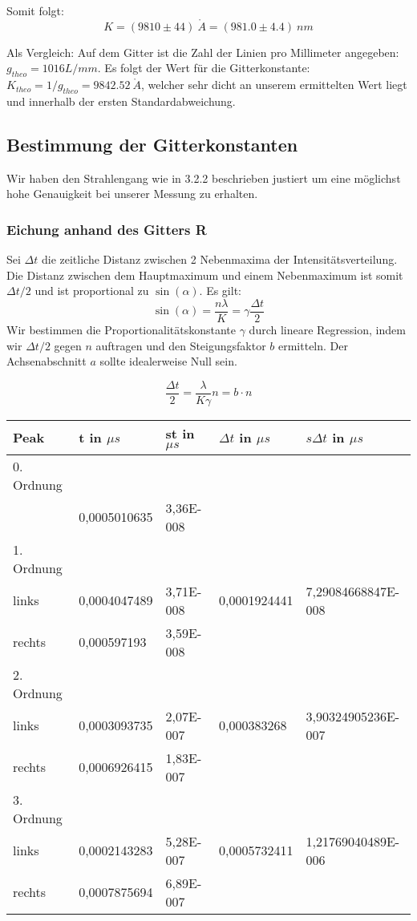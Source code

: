 Somit folgt: $$\boxed{K=(9810 \pm 44) \ \mathring A = (981.0 \pm 4.4) \ nm}$$

Als Vergleich: Auf dem Gitter ist die Zahl der Linien pro Millimeter angegeben: \\ $g_{theo}=1016 L/mm$. Es folgt der Wert f\"ur die Gitterkonstante: $K_{theo} = 1/g_{theo} = 9842.52 \ \mathring A$, welcher sehr dicht an unserem ermittelten Wert liegt und innerhalb der ersten Standardabweichung.

\subsection{Bestimmung der Gitterkonstanten}

Wir haben den Strahlengang wie in 3.2.2 beschrieben justiert um eine m\"oglichst hohe Genauigkeit bei unserer Messung zu erhalten.

\subsubsection{Eichung anhand des Gitters R}

Sei $\Delta t$ die zeitliche Distanz zwischen 2 Nebenmaxima der Intensit\"atsverteilung. Die Distanz zwischen dem Hauptmaximum und einem Nebenmaximum ist somit $\Delta t/2$ und ist proportional zu $\sin(\alpha)$. Es gilt: $$\sin(\alpha) = \frac{n\lambda}{K} = \gamma \frac{\Delta t}{2}$$
Wir bestimmen die Proportionalit\"atskonstante $\gamma$ durch lineare Regression, indem wir $\Delta t/2$ gegen $n$ auftragen und den Steigungsfaktor $b$ ermitteln. Der Achsenabschnitt $a$ sollte idealerweise Null sein.

$$\frac{\Delta t}{2} = \frac{\lambda}{K\gamma}n = b\cdot n$$

\begin{center}
\begin{tabular}{lllll}
\toprule
Peak & t in $\mu s$ & st in $\mu s$ & $\Delta t$ in $\mu s$ & $s\Delta t$ in $\mu s$ \\
\midrule
0. Ordnung \\
 & 0,0005010635 & 3,36E-008\\
\midrule
1. Ordnung\\
links & 0,0004047489 & 3,71E-008 & 0,0001924441 & 7,29084668847E-008\\
rechts & 0,000597193 & 3,59E-008\\
\midrule
2. Ordnung\\ 
links & 0,0003093735 & 2,07E-007 & 0,000383268 & 3,90324905236E-007\\
rechts & 0,0006926415 & 1,83E-007\\
\midrule
3. Ordnung\\ 
links & 0,0002143283 & 5,28E-007 & 0,0005732411 & 1,21769040489E-006\\
rechts & 0,0007875694 & 6,89E-007\\
\bottomrule
\end{tabular}
\end{center}

